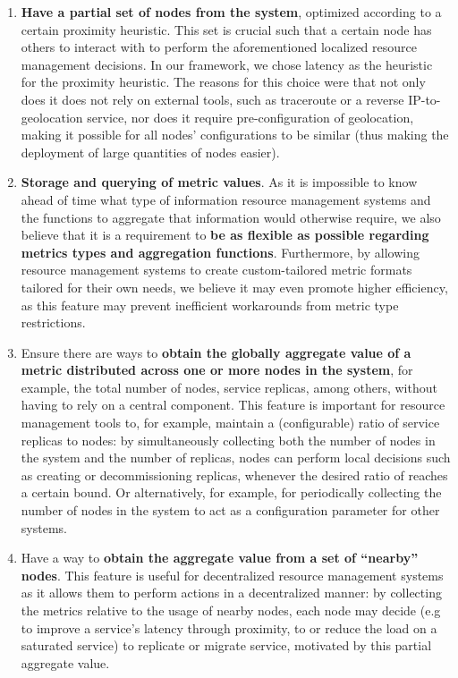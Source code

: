 \begin{enumerate} \label{enum:demmon}

    \item \textbf{Have a partial set of nodes from the system}, optimized according to a certain proximity heuristic. This set is crucial such that a certain node has others to interact with to perform the aforementioned localized resource management decisions. In our framework, we chose latency as the heuristic for the proximity heuristic. The reasons for this choice were that not only does it does not rely on external tools, such as traceroute or a reverse IP-to-geolocation service, nor does it require pre-configuration of geolocation, making it possible for all nodes' configurations to be similar (thus making the deployment of large quantities of nodes easier). \label{enum:demmon_1}
    
     \item \textbf{Storage and querying of metric values}. As it is impossible to know ahead of time what type of information resource management systems and the functions to aggregate that information would otherwise require, we also believe that it is a requirement to \textbf{be as flexible as possible regarding metrics types and aggregation functions}. Furthermore, by allowing resource management systems to create custom-tailored metric formats tailored for their own needs, we believe it may even promote higher efficiency, as this feature may prevent inefficient workarounds from metric type restrictions. \label{enum:demmon_4}
    
    \item \label{enum:demmon_2} Ensure there are ways to \textbf{obtain the globally aggregate value of a metric distributed across one or more nodes in the system}, for example, the total number of nodes, service replicas, among others, without having to rely on a central component. This feature is important for resource management tools to, for example, maintain a (configurable) ratio of service replicas to nodes: by simultaneously collecting both the number of nodes in the system and the number of replicas, nodes can perform local decisions such as creating or decommissioning replicas, whenever the desired ratio of reaches a certain bound. Or alternatively, for example, for periodically collecting the number of nodes in the system to act as a configuration parameter for other systems. 
    
    \item Have a way to \textbf{obtain the aggregate value from a set of ``nearby'' nodes}. This feature is useful for decentralized resource management systems as it allows them to perform actions in a decentralized manner: by collecting the metrics relative to the usage of nearby nodes, each node may decide (e.g to improve a service's latency through proximity, to or reduce the load on a saturated service) to replicate or migrate service, motivated by this partial aggregate value. \label{enum:demmon_3}
    

\end{enumerate}
